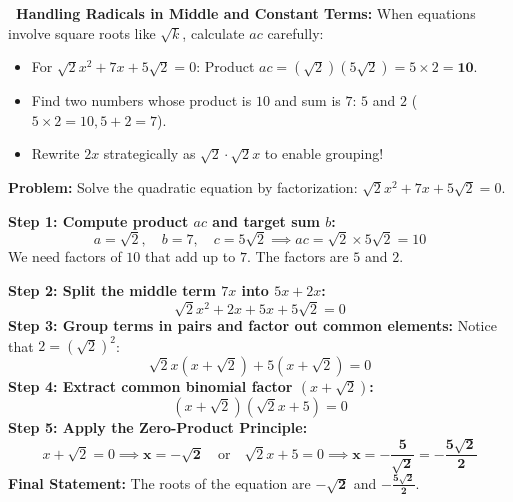 \documentclass[10pt,a4paper]{article}
\newcommand{\TrapTag}{\tcbox[colback=redpale,colframe=reddeep!40,boxrule=.3pt,arc=1mm,left=1.5mm,right=1.5mm,top=.5mm,bottom=.5mm]{\scriptsize\bfseries\color{reddeep}TRAP ALERT}}
\begin{document}
\begin{warningBox}
  \textbf{\TrapTag\ Handling Radicals in Middle and Constant Terms:}
  When equations involve square roots like $\sqrt{k}$, calculate $ac$ carefully:
  \begin{itemize}
    \item For $\sqrt{2}x^2 + 7x + 5\sqrt{2} = 0$: Product $ac = (\sqrt{2})(5\sqrt{2}) = 5 \times 2 = \mathbf{10}$.
    \item Find two numbers whose product is $10$ and sum is $7$: $5$ and $2$ ($5 \times 2 = 10, 5 + 2 = 7$).
    \item Rewrite $2x$ strategically as $\sqrt{2} \cdot \sqrt{2}x$ to enable grouping!
  \end{itemize}
\end{warningBox}

\vspace{0.8mm}
\begin{conceptBox}[title={Worked Archetype 3 $\vert$ Factorization with Radical Coefficients},fonttitle=\bfseries\color{navy}]
  \textbf{Problem:} Solve the quadratic equation by factorization: $\sqrt{2}x^2 + 7x + 5\sqrt{2} = 0$.
  \par\vspace{0.6mm}\noindent
  \textbf{Step 1: Compute product $ac$ and target sum $b$:}
  $$a = \sqrt{2}, \quad b = 7, \quad c = 5\sqrt{2} \implies ac = \sqrt{2} \times 5\sqrt{2} = 10$$
  We need factors of $10$ that add up to $7$. The factors are $5$ and $2$.
  \par\noindent
  \textbf{Step 2: Split the middle term $7x$ into $5x + 2x$:}
  $$\sqrt{2}x^2 + 2x + 5x + 5\sqrt{2} = 0$$
  \textbf{Step 3: Group terms in pairs and factor out common elements:}
  Notice that $2 = (\sqrt{2})^2$:
  $$\sqrt{2}x(x + \sqrt{2}) + 5(x + \sqrt{2}) = 0$$
  \textbf{Step 4: Extract common binomial factor $(x + \sqrt{2})$:}
  $$(x + \sqrt{2})(\sqrt{2}x + 5) = 0$$
  \textbf{Step 5: Apply the Zero-Product Principle:}
  $$x + \sqrt{2} = 0 \implies \mathbf{x = -\sqrt{2}} \quad \text{or} \quad \sqrt{2}x + 5 = 0 \implies \mathbf{x = -\frac{5}{\sqrt{2}} = -\frac{5\sqrt{2}}{2}}$$
  \textbf{Final Statement:} The roots of the equation are $\mathbf{-\sqrt{2}}$ and $\mathbf{-\frac{5\sqrt{2}}{2}}$.
\end{conceptBox}

\newpage

\thispagestyle{fancy}
\vspace*{0mm}
\end{document}
